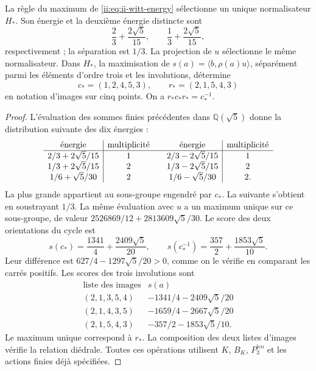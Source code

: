 \begin{proposition}
\label{ii:prop:ii-witt-variational-selection}
La règle du maximum de \eqref{ii:eq:ii-witt-energy} sélectionne un unique
normalisateur \(H_*\). Son énergie et la deuxième énergie distincte sont
\[
 \frac23+\frac{2\sqrt5}{15},\qquad
 \frac13+\frac{2\sqrt5}{15},
\]
respectivement ; la séparation est \(1/3\). La projection de \(u\)
sélectionne le même normalisateur. Dans \(H_*\), la maximisation de
\(s(a)=\langle b,\rho(a)u\rangle\), séparément parmi les éléments
d’ordre trois et les involutions, détermine
\[
 c_*=(1,2,4,5,3),\qquad r_*=(2,1,5,4,3)
\]
en notation d’images sur cinq points. On a
\(r_*c_*r_*=c_*^{-1}\).
\end{proposition}
\begin{proof}
L’évaluation des sommes finies précédentes dans \(\mathbb Q(\sqrt5)\)
donne la distribution suivante des dix énergies :
\[
\begin{array}{c|c@{\qquad}c|c}
\text{énergie}&\text{multiplicité}&\text{énergie}&\text{multiplicité}\\ \hline
2/3+2\sqrt5/15&1&2/3-2\sqrt5/15&1\\
1/3+2\sqrt5/15&2&1/3-2\sqrt5/15&2\\
1/6+\sqrt5/30&2&1/6-\sqrt5/30&2.
\end{array}
\]
La plus grande appartient au sous-groupe engendré par \(c_*\). La suivante
s’obtient en soustrayant \(1/3\). La même évaluation avec \(u\) a un maximum
unique sur ce sous-groupe, de valeur
\(2526869/12+2813609\sqrt5/30\).
Le score des deux orientations du cycle est
\[
 s(c_*)=\frac{1341}{4}+\frac{2409\sqrt5}{20},\qquad
 s(c_*^{-1})=\frac{357}{2}+\frac{1853\sqrt5}{10}.
\]
Leur différence est \(627/4-1297\sqrt5/20>0\), comme on le vérifie
en comparant les carrés positifs. Les scores des trois
involutions sont
\[
\begin{array}{c|c}
\text{liste des images}&s(a)\\ \hline
(2,1,3,5,4)&-1341/4-2409\sqrt5/20\\
(2,1,4,3,5)&-1659/4-2667\sqrt5/20\\
(2,1,5,4,3)&-357/2-1853\sqrt5/10.
\end{array}
\]
Le maximum unique correspond à \(r_*\). La composition des deux listes
d’images vérifie la relation diédrale. Toutes ces opérations utilisent
\(K\), \(B_K\), \(P_3^{\mathrm{ico}}\) et les actions finies déjà spécifiées.
\end{proof}

